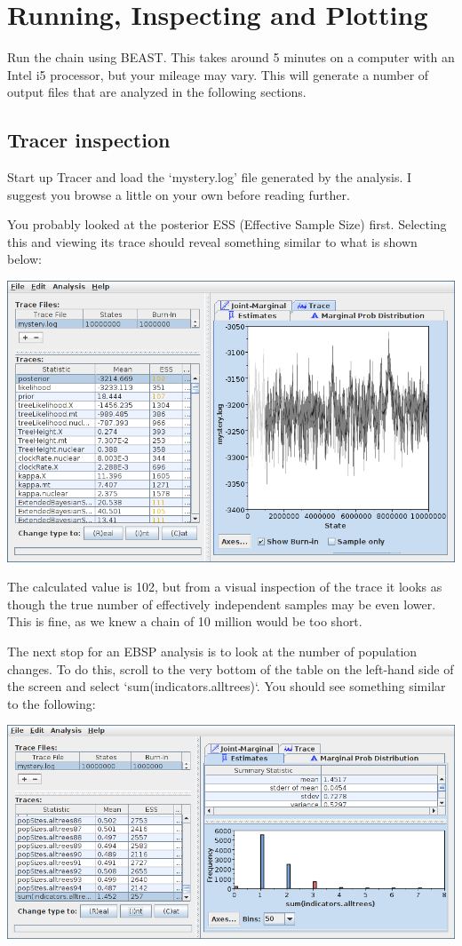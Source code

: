 \documentclass[a4paper,11pt]{article}
\begin{document}
\section{Running, Inspecting and Plotting}

Run the chain using BEAST. This takes around 5 minutes on a computer with an
Intel i5 processor, but your mileage may vary. This will generate a number of
output files that are analyzed in the following sections.

\subsection{Tracer inspection}

Start up Tracer and load the `mystery.log' file generated by the analysis.  I
suggest you browse a little on your own before reading further.

You probably looked at the posterior ESS (Effective Sample Size) first.
Selecting this and viewing its trace should reveal something similar to what is
shown below:

\includegraphics[width=\textwidth]{figures/tracer1.png}

The calculated value is 102, but from a visual inspection of the trace it looks
as though the true number of effectively independent samples may be even lower.
This is fine, as we knew a chain of 10 million would be too short.

The next stop for an EBSP analysis is to look at the number of population
changes. To do this, scroll to the very bottom of the table on the left-hand
side of the screen and select `sum(indicators.alltrees)`.  You should see
something similar to the following:

\includegraphics[width=\textwidth]{figures/tracer2.png}
\end{document}
